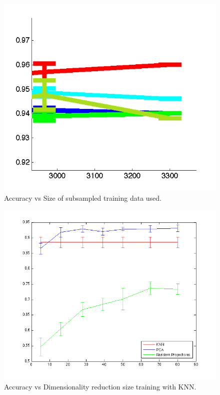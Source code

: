 \begin{center}
\begin{figure}[!ht]
\centering
\includegraphics[width=.7\textwidth]{../images/c3zoombig.png}
\caption{Accuracy vs Size of subsampled training data used.}
\label{fig:largecomparekleg}
\end{figure}
\end{center}

\begin{center}
\begin{figure}[!ht]
\centering
\includegraphics[width=.7\textwidth]{../images/knnVpcaVrproj.png}
\caption{Accuracy vs Dimensionality reduction size training with KNN.}
\label{fig:knn}
\end{figure}
\end{center}

